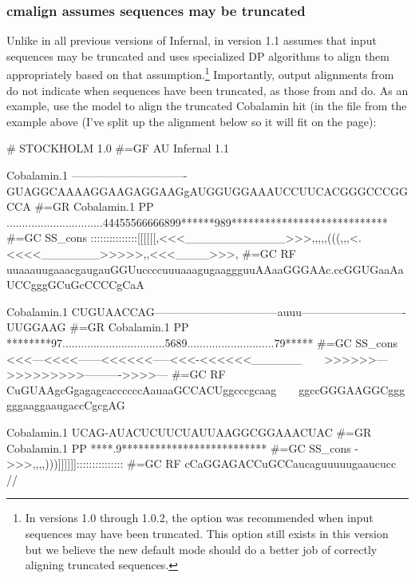 \subsubsection{cmalign assumes sequences may be truncated}
Unlike in all previous versions of Infernal,  in version
1.1 assumes that input sequences may be truncated and uses specialized
DP algorithms to align them appropriately based on that
assumption.\footnote{In versions 1.0 through 1.0.2, the 
   option was recommended when input sequences may have
  been truncated. This option still exists in this version but we
  believe the new default mode should do a better job of correctly
  aligning truncated sequences.} Importantly, output alignments from
 do not indicate when sequences have been truncated, as
those from  and  do. As an example, use
the  model to align the truncated
Cobalamin hit (in the file  from the
 example above (I've split up the alignment below so it
will fit on the page):


\begin{sreoutput}
# STOCKHOLM 1.0
#=GF AU Infernal 1.1

Cobalamin.1         -------------------------------GUAGGCAAAAGGAAGAGGAAGgAUGGUGGAAAUCCUUCACGGGCCCGGCCA
#=GR Cobalamin.1 PP ...............................44455566666899******989****************************
#=GC SS_cons        :::::::::::::::[[[[[[,<<<____________>>>,,,,,(((,,,<.<<<<_______>>>>>,,<<<____>>>,
#=GC RF             uuaaauugaaacgaugauGGUuccccuuuaaagugaaggguuAAaaGGGAAc.ccGGUGaaAaUCCgggGCuGcCCCCgCaA

Cobalamin.1         CUGUAACCAG---------------------------------auuu----------------------------UUGGAAG
#=GR Cobalamin.1 PP ********97.................................5689............................79*****
#=GC SS_cons        <<<---<<<<------<<<<<<-----<<<-<<<<<<______~~~~>>>>>>--->>>>>>>>>---------->>>>---
#=GC RF             CuGUAAgcGgagagcaccccccAauaaGCCACUggcccgcaag~~~~ggccGGGAAGGCggggggaaggaaugaccCgcgAG

Cobalamin.1         UCAG-AUACUCUUCUAUUAAGGCGGAAACUAC
#=GR Cobalamin.1 PP ****.9**************************
#=GC SS_cons        ->>>,,,,)))]]]]]]:::::::::::::::
#=GC RF             cCaGGAGACCuGCCaucaguuuuugaaucucc
//
\end{sreoutput}


